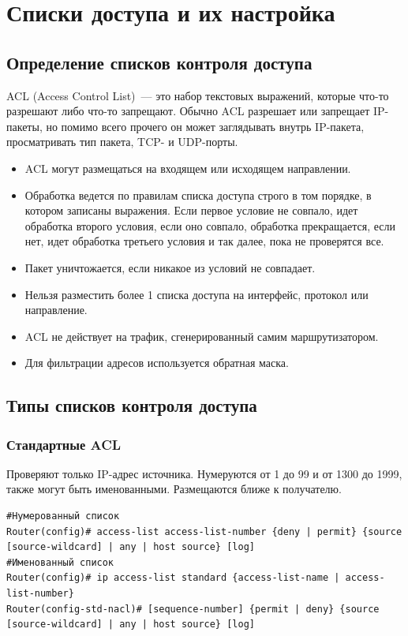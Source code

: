 	\newpage
	
	\section{Списки доступа и их настройка}
	
	\subsection*{Определение списков контроля доступа}
	ACL (Access Control List)~--- это набор текстовых выражений, которые что-то разрешают либо что-то запрещают. Обычно ACL разрешает или запрещает IP-пакеты, но помимо всего прочего он может заглядывать внутрь IP-пакета, просматривать тип пакета, TCP- и UDP-порты.
	
	\begin{itemize}
		\item ACL могут размещаться на входящем или исходящем направлении.
		\item Обработка ведется по правилам списка доступа строго в том порядке, в котором записаны выражения. Если первое условие не совпало, идет обработка второго условия, если оно совпало, обработка прекращается, если нет, идет обработка третьего условия и так далее, пока не проверятся все. 
		\item Пакет уничтожается, если никакое из условий не совпадает. 
		\item Нельзя разместить более 1 списка доступа на интерфейс, протокол или направление.
		\item ACL не действует на трафик, сгенерированный самим маршрутизатором.
		\item Для фильтрации адресов используется обратная маска.
	\end{itemize}
	
	\subsection*{Типы списков контроля доступа}
	
	\subsubsection*{Стандартные ACL}
	Проверяют только IP-адрес источника. Нумеруются от 1 до 99 и от 1300 до 1999, также могут быть именованными. Размещаются ближе к получателю.
	
	\begin{verbatim}
#Нумерованный список
Router(config)# access-list access-list-number {deny | permit} {source [source-wildcard] | any | host source} [log]
#Именованный список 
Router(config)# ip access-list standard {access-list-name | access-list-number}
Router(config-std-nacl)# [sequence-number] {permit | deny} {source [source-wildcard] | any | host source} [log]
	\end{verbatim}
	
